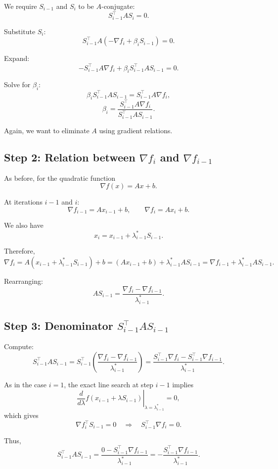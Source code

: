 \documentclass[9pt,a4paper]{extarticle}
\begin{document}
We require $S_{i-1}$ and $S_i$ to be $A$-conjugate:
\[
S_{i-1}^\top A S_i = 0.
\]

Substitute $S_i$:
\[
S_{i-1}^\top A(-\nabla f_i + \beta_i S_{i-1}) = 0.
\]

Expand:
\[
- S_{i-1}^\top A \nabla f_i + \beta_i S_{i-1}^\top A S_{i-1} = 0.
\]

Solve for $\beta_i$:
\[
\beta_i S_{i-1}^\top A S_{i-1} = S_{i-1}^\top A \nabla f_i,
\]
\[
\beta_i = \frac{S_{i-1}^\top A \nabla f_i}{S_{i-1}^\top A S_{i-1}}.
\]

Again, we want to eliminate $A$ using gradient relations.

\subsection*{Step 2: Relation between \texorpdfstring{$\nabla f_i$}{grad fi} and \texorpdfstring{$\nabla f_{i-1}$}{grad f(i-1)}}

As before, for the quadratic function
\[
\nabla f(x) = A x + b.
\]

At iterations $i-1$ and $i$:
\[
\nabla f_{i-1} = A x_{i-1} + b,
\qquad
\nabla f_i = A x_i + b.
\]

We also have
\[
x_i = x_{i-1} + \lambda_{i-1}^* S_{i-1}.
\]

Therefore,
\[
\nabla f_i
= A(x_{i-1} + \lambda_{i-1}^* S_{i-1}) + b
= (A x_{i-1} + b) + \lambda_{i-1}^* A S_{i-1}
= \nabla f_{i-1} + \lambda_{i-1}^* A S_{i-1}.
\]

Rearranging:
\[
A S_{i-1} = \frac{\nabla f_i - \nabla f_{i-1}}{\lambda_{i-1}^*}.
\]

\subsection*{Step 3: Denominator $S_{i-1}^\top A S_{i-1}$}

Compute:
\[
S_{i-1}^\top A S_{i-1}
= S_{i-1}^\top \left( \frac{\nabla f_i - \nabla f_{i-1}}{\lambda_{i-1}^*} \right)
= \frac{S_{i-1}^\top \nabla f_i - S_{i-1}^\top \nabla f_{i-1}}{\lambda_{i-1}^*}.
\]

As in the case $i=1$, the exact line search at step $i-1$ implies
\[
\left. \frac{d}{d\lambda} f(x_{i-1} + \lambda S_{i-1}) \right|_{\lambda = \lambda_{i-1}^*}
= 0,
\]
which gives
\[
\nabla f_i^\top S_{i-1} = 0
\quad\Longrightarrow\quad
S_{i-1}^\top \nabla f_i = 0.
\]

Thus,
\[
S_{i-1}^\top A S_{i-1}
= \frac{0 - S_{i-1}^\top \nabla f_{i-1}}{\lambda_{i-1}^*}
= - \frac{S_{i-1}^\top \nabla f_{i-1}}{\lambda_{i-1}^*}.
\]
\end{document}
